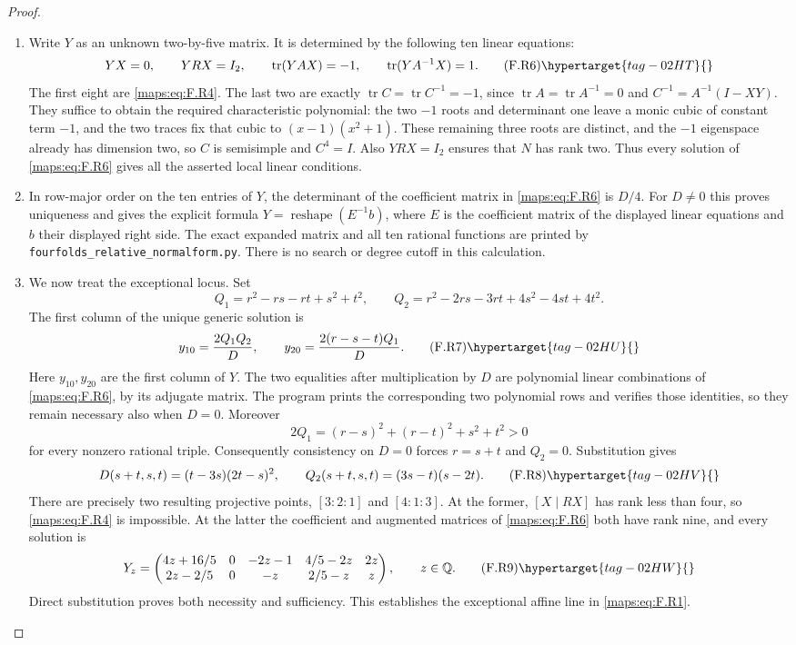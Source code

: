 \begin{proof}
\begin{enumerate}[label={$\langle1\rangle$\arabic*.}]
\item Write $Y$ as an unknown two-by-five matrix.  It is determined
by the following ten linear equations:
\[
 YX=0,\qquad YRX=I_2,\qquad
 \operatorname{tr}(YAX)=-1,\qquad
 \operatorname{tr}(YA^{-1}X)=1.
 \tag{F.R6}\hypertarget{tag-02HT}{}\label{maps:eq:F.R6}
\]
The first eight are \eqref{maps:eq:F.R4}.  The last two are exactly
$\operatorname{tr}C=\operatorname{tr}C^{-1}=-1$, since
$\operatorname{tr}A=\operatorname{tr}A^{-1}=0$ and
$C^{-1}=A^{-1}(I-XY)$.
They suffice to obtain the required characteristic
polynomial: the two $-1$ roots and determinant one leave a
monic cubic of constant term $-1$, and the two traces fix
that cubic to $(x-1)(x^2+1)$.
These remaining three roots are distinct, and the $-1$
eigenspace already has dimension two, so $C$ is semisimple
and $C^4=I$.  Also $YRX=I_2$ ensures that $N$ has rank two.
Thus every solution of \eqref{maps:eq:F.R6} gives all the asserted local
linear conditions.

\item In row-major order on the ten entries of $Y$, the determinant
of the coefficient matrix in \eqref{maps:eq:F.R6} is $D/4$.
For $D\ne0$ this proves uniqueness and gives the explicit
formula $Y=\operatorname{reshape}(E^{-1}b)$, where $E$ is
the coefficient matrix of the displayed linear equations
and $b$ their displayed right side.
The exact expanded matrix and all ten rational functions
are printed by \texttt{fourfolds\_relative\_normalform.py}.
There is no search or degree cutoff in this calculation.

\item We now treat the exceptional locus.
Set
\[
 Q_1=r^2-rs-rt+s^2+t^2,
 \qquad Q_2=r^2-2rs-3rt+4s^2-4st+4t^2.
\]
The first column of the unique generic solution is
\[
 y_{10}=\frac{2Q_1Q_2}{D},\qquad
 y_{20}=\frac{2(r-s-t)Q_1}{D}.
 \tag{F.R7}\hypertarget{tag-02HU}{}\label{maps:eq:F.R7}
\]
Here $y_{10},y_{20}$ are the first column of $Y$.
The two equalities after multiplication by $D$ are polynomial
linear combinations of \eqref{maps:eq:F.R6}, by its adjugate matrix.
The program prints the corresponding two polynomial rows
and verifies those identities, so they remain necessary
also when $D=0$.
Moreover
\[
 2Q_1=(r-s)^2+(r-t)^2+s^2+t^2>0
\]
for every nonzero rational triple.  Consequently consistency
on $D=0$ forces $r=s+t$ and $Q_2=0$.
Substitution gives
\[
 D(s+t,s,t)=(t-3s)(2t-s)^2,
 \qquad Q_2(s+t,s,t)=(3s-t)(s-2t).
 \tag{F.R8}\hypertarget{tag-02HV}{}\label{maps:eq:F.R8}
\]
There are precisely two resulting projective points,
$[3:2:1]$ and $[4:1:3]$.
At the former, $[X\mid RX]$ has rank less than four, so
\eqref{maps:eq:F.R4} is impossible.  At the latter the coefficient and
augmented matrices of \eqref{maps:eq:F.R6} both have rank nine, and every
solution is
\[
 Y_z=\begin{pmatrix}
 4z+16/5&0&-2z-1&4/5-2z&2z\\
 2z-2/5&0&-z&2/5-z&z
 \end{pmatrix},\qquad z\in\mathbb Q.
 \tag{F.R9}\hypertarget{tag-02HW}{}\label{maps:eq:F.R9}
\]
Direct substitution proves both necessity and sufficiency.
This establishes the exceptional affine line in \eqref{maps:eq:F.R1}.


\end{enumerate}
\end{proof}
